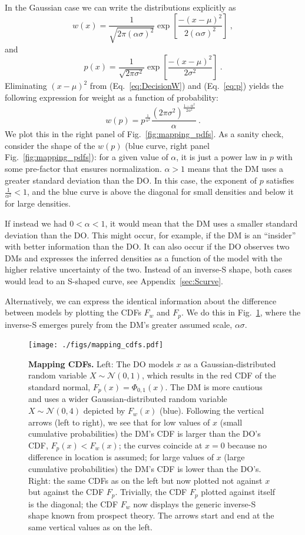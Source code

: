 \documentclass[a4paper, 12pt]{article}
\newcommand{\elabel}[1]{\label{eq:#1}}
\newcommand{\eref}[1]{(Eq.~\ref{eq:#1})}
\newcommand{\flabel}[1]{\label{fig:#1}}
\newcommand{\fref}[1]{Fig.~\ref{fig:#1}}
\newcommand{\Appref}[1]{Appendix~\ref{sec:#1}}
\newcommand{\be}{\begin{equation}}
\newcommand{\ee}{\end{equation}}
\newcommand{\ND}{\mathcal{N}} %
\begin{document}
In the Gaussian case we can write the distributions explicitly as
\be
w(x)=\frac{1}{\sqrt{2\pi (\alpha \sigma)^2}}\exp\left[\frac{-(x -\mu )^2}{2 (\alpha \sigma)^2}\right]~,
\elabel{DecisionW}
\ee
and
\be
p(x)=\frac{1}{\sqrt{2\pi \sigma^2}}\exp\left[\frac{-(x -\mu )^2}{2 \sigma^2}\right] ~.
\elabel{p}
\ee
Eliminating $(x-\mu)^2$ from \eref{DecisionW} and \eref{p} yields the following expression for weight as a function of probability:
\be
w(p)= p^{\frac{1}{\alpha^2}} \frac{\left(2\pi\sigma^2\right)^{\frac{1-\alpha^2}{2\alpha^2}}}{\alpha} ~.
\elabel{w_of_p}
\ee
We plot this in the right panel of \fref{mapping_pdfs}. As a sanity check, consider the shape of the $w(p)$ (blue curve, right panel \fref{mapping_pdfs}): for a given value of $\alpha$, it is just a power law in $p$ with some pre-factor that ensures normalization. $\alpha>1$ means that the DM uses a greater standard deviation than the DO. In this case, the exponent of $p$ satisfies $\frac{1}{\alpha^2}<1$, and the blue curve is above the diagonal for small densities and below it for large densities.

If instead we had $0<\alpha<1$, it would mean that the DM uses a smaller standard deviation than the DO.
This might occur, for example, if the DM is an ``insider'' with better information than the DO.
It can also occur if the DO observes two DMs and expresses the inferred densities as a function of the model with the higher relative uncertainty of the two.
Instead of an inverse-S shape, both cases would lead to an S-shaped curve, see \Appref{Scurve}.

Alternatively, we can express the identical information about the difference between models by plotting the CDFs $F_w$ and $F_p$. We do this in \fref{mapping_cdfs}, where the inverse-S emerges purely from the DM's greater assumed scale, $\alpha \sigma$.
\begin{figure}[!htb]
\centering
\texttt{[image: ./figs/mapping\_cdfs.pdf]}
\caption{\textbf{Mapping CDFs.}
Left: The DO models $x$ as a Gaussian-distributed random variable $X \sim \ND(0,1)$, which results in the red CDF of the standard normal, $F_p(x) = \Phi_{0,1}(x)$. The DM is more cautious and uses a wider Gaussian-distributed random variable $X \sim \ND(0,4)$ depicted by $F_w(x)$ (blue).
%
Following the vertical arrows (left to right), we see that for low values of $x$ (small cumulative probabilities) the DM's CDF is larger than the DO's CDF, $F_p(x) < F_w(x)$; the curves coincide at $x=0$ because no difference in location is assumed; for large values of $x$ (large cumulative probabilities) the DM's CDF is lower than the DO's.
Right: the same CDFs as on the left but now plotted not against $x$ but against the CDF $F_p$. Trivially, the CDF $F_p$ plotted against itself is the diagonal; the CDF $F_w$ now displays the generic inverse-S shape known from prospect theory. The arrows start and end at the same vertical values as on the left.
}
\flabel{mapping_cdfs}
\end{figure}
\end{document}
